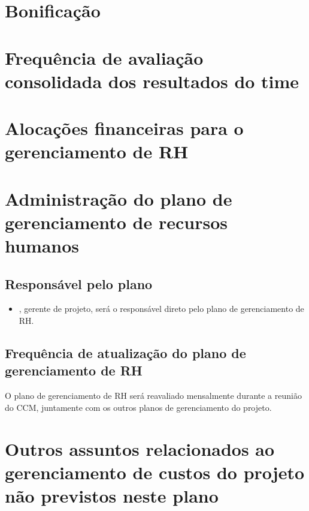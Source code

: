 
\section{Bonificação}


\section{Frequência de avaliação consolidada dos resultados do time}


\section{Alocações financeiras para o gerenciamento de RH}


\section{Administração do plano de gerenciamento de recursos humanos}

\subsection{Responsável pelo plano}

\begin{itemize}
	\item \projectManagerName, gerente de projeto, será o responsável direto pelo plano de gerenciamento de RH.
\end{itemize}

\subsection{Frequência de atualização do plano de gerenciamento de RH}

O plano de gerenciamento de RH será reavaliado mensalmente durante a reunião do CCM, juntamente com os outros planos de gerenciamento do projeto.

\section{Outros assuntos relacionados ao gerenciamento de custos do projeto não previstos neste plano}

